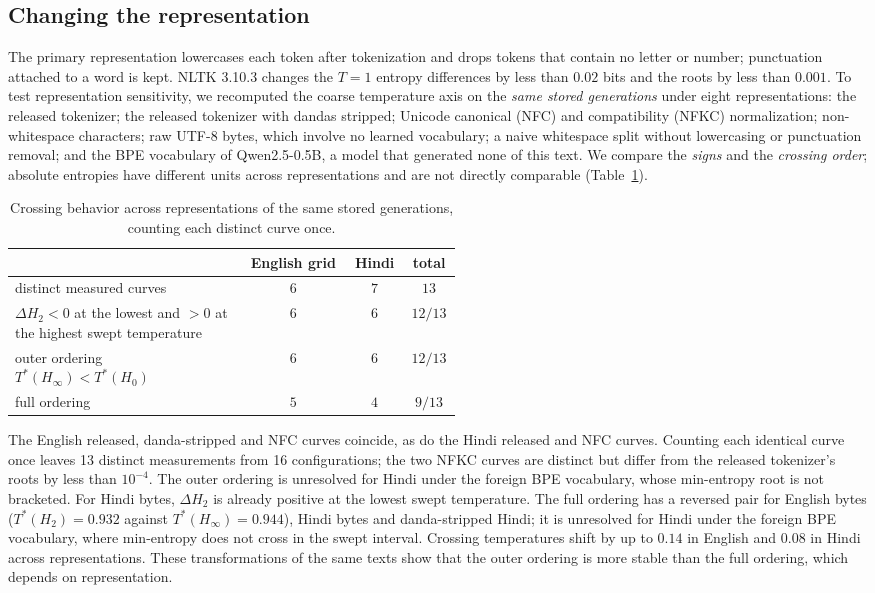 \documentclass[10pt]{article}
\theoremstyle{plain}
\theoremstyle{definition}
\newcommand{\Htwo}{H_2}
\newcommand{\Hz}{H_0}
\newcommand{\Hinf}{H_\infty}
\begin{document}
\subsection{Changing the representation}
\label{app:repr}

The primary representation lowercases each token after tokenization and drops tokens that
contain no letter or number;
punctuation attached to a word is kept. NLTK 3.10.3 changes the $T=1$ entropy differences
by less than $0.02$ bits and the roots by less than $0.001$. To test representation sensitivity, we recomputed the coarse temperature
axis on the \emph{same stored generations} under eight representations: the released tokenizer;
the released tokenizer with dandas stripped; Unicode canonical (NFC) and compatibility (NFKC)
normalization; non-whitespace
characters; raw UTF-8 bytes, which involve no learned vocabulary; a naive whitespace split without
lowercasing or punctuation removal; and the BPE vocabulary of Qwen2.5-0.5B, a model that generated
none of this text. We compare the \emph{signs} and the \emph{crossing order}; absolute entropies
have different units across representations and are not directly comparable
(Table~\ref{tab:repr}).

\begin{table}[ht]
\centering\small
\caption{Crossing behavior across representations of the same stored generations, counting each
distinct curve once.}
\label{tab:repr}
\begin{tabular}{p{0.52\linewidth}ccc}
\toprule
 & English grid & Hindi & total \\
\midrule
distinct measured curves & $6$ & $7$ & $13$ \\
$\Delta\Htwo<0$ at the lowest and $>0$ at the highest swept temperature & $6$ & $6$ & $12/13$ \\
outer ordering $T^\ast(\Hinf)<T^\ast(\Hz)$ & $6$ & $6$ & $12/13$ \\
full ordering & $5$ & $4$ & $9/13$ \\
\bottomrule
\end{tabular}
\end{table}

The English released, danda-stripped and NFC curves coincide, as do the Hindi released and NFC
curves. Counting each identical curve once leaves 13 distinct measurements from 16
configurations; the two NFKC curves are distinct but differ from the released tokenizer's roots by
less than $10^{-4}$. The outer ordering is unresolved for Hindi under the foreign BPE vocabulary, whose
min-entropy root is not bracketed. For Hindi bytes, $\Delta\Htwo$ is
already positive at the lowest swept temperature. The full ordering has a
reversed pair for English bytes ($T^\ast(H_2)=0.932$ against $T^\ast(H_\infty)=0.944$), Hindi
bytes and danda-stripped Hindi; it is unresolved for Hindi under the foreign
BPE vocabulary, where min-entropy does not cross in the swept interval. Crossing temperatures shift by up to $0.14$ in English and
$0.08$ in Hindi across representations. These transformations of the same texts show that the
outer ordering is more stable than the full ordering, which depends on representation.
\end{document}
